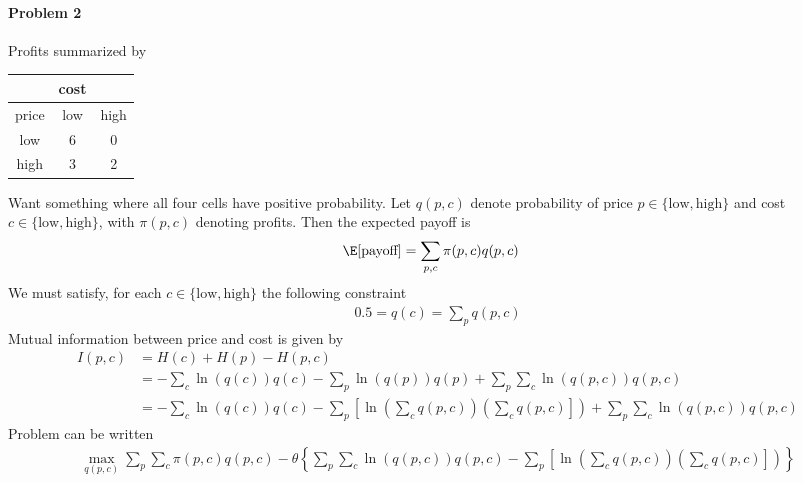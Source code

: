 \documentclass[12pt]{article}
\theoremstyle{plain}
\theoremstyle{definition}
\theoremstyle{remark}
\begin{document}
\paragraph{Problem 2}

Profits summarized by
\begin{table}[htbp!]
\centering
\begin{tabular}{c|cc}
  & cost & \\\hline
  price & low & high \\\hline\hline
  low & 6 & 0 \\
  high & 3 & 2
\end{tabular}
\end{table}
Want something where all four cells have positive probability.
Let $q(p,c)$ denote probability of price
$p\in\{\text{low},\text{high}\}$ and cost
$c\in\{\text{low},\text{high}\}$,
with $\pi(p,c)$ denoting profits.
Then the expected payoff is
\begin{align*}
  \E[\text{payoff}]
  &= \sum_{p,c} \pi(p,c)q(p,c)
\end{align*}
We must satisfy, for each $c\in\{\text{low},\text{high}\}$ the following
constraint
\begin{align*}
  0.5 = q(c) = \sum_{p} q(p,c)
\end{align*}
Mutual information between price and cost is given by
\begin{align*}
  I(p,c)
  &= H(c) + H(p) - H(p,c)
  \\
  &=
  -\sum_c
  \ln(q(c))
  q(c)
  -
  \sum_p
  \ln\left(q(p)\right)
  q(p)
  +
  \sum_p
  \sum_c
  \ln\left(q(p,c)\right)q(p,c)
  \\
  &=
  -\sum_c
  \ln(q(c))
  q(c)
  -
  \sum_p
  \left[
  \ln\left(\sum_c q(p,c)\right)
  \left(
  \sum_c
  q(p,c)
  \right]
  \right)
  +
  \sum_p
  \sum_c
  \ln\left(q(p,c)\right)q(p,c)
\end{align*}
Problem can be written
\begin{align*}
  \max_{q(p,c)}
  \sum_p\sum_c
  \pi(p,c) q(p,c)
  - \theta
  \left\{
  \sum_p
  \sum_c
  \ln\left(q(p,c)\right)q(p,c)
  -
  \sum_p
  \left[
  \ln\left(\sum_c q(p,c)\right)
  \left(
  \sum_c
  q(p,c)
  \right]
  \right)
  \right\}
\end{align*}
\end{document}
